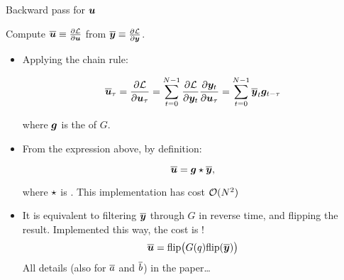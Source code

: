 \documentclass{beamer}
\begin{document}

\appendix

 \begin{frame}{Backward pass for $\bm{u}$}
 
 Compute $\overline{\bm{u}} \equiv \frac{\partial \mathcal{L}}{\partial \bm{u}}$ from $\overline{\bm{y}}\equiv \frac{\partial \mathcal{L}}{\partial \bm{y}}$. \\
 \pause
 \begin{itemize}
 \item Applying the chain rule:
 \begin{footnotesize}
$$\overline{\bm{u}}_\tau = \frac{\partial \mathcal{L}}{\partial \bm{u}_\tau} 
= \sum_{t=0}^{N-1}{\frac{\partial \mathcal{L}}{\partial \bm{y}_t} \frac{\partial \bm{y}_t}{\partial \bm{u}_\tau}}
=\sum_{t=0}^{N-1}{\overline{\bm{y}}_t \bm{g}_{t-\tau}}
$$
\end{footnotesize}
where $\bm{g}$ is the  of $G$.%
\pause
\item From the expression above, by definition:
\begin{footnotesize}
$$\overline{\bm{u}} = \bm{g} \star \overline{\bm{y}},
$$
\end{footnotesize}
where  $\star$ is .
This implementation has cost  \alert{$\mathcal{O}(N^2)$}
\pause
\item It is equivalent to filtering $\overline{\bm{y}}$ through $G$ in reverse time, and flipping the result. Implemented this way, the cost is {}! 
$$ \overline{\bm{u}} = \mathrm{flip}\big(G(q) \mathrm{flip}(\overline{\bm{y}})\big)$$
\pause  All details (also for $\overline{a}$ and $\overline{b}$) in the paper\dots
\end{itemize}
\end{frame}
\end{document}
